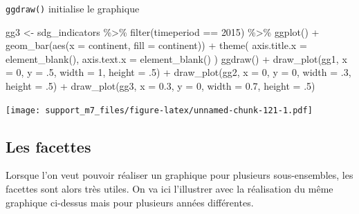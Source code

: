 \documentclass[
]{book}
\newenvironment{Shaded}{\begin{snugshade}}{\end{snugshade}}
\newcommand{\AttributeTok}[1]{\textcolor[rgb]{0.77,0.63,0.00}{#1}}
\newcommand{\DecValTok}[1]{\textcolor[rgb]{0.00,0.00,0.81}{#1}}
\newcommand{\FloatTok}[1]{\textcolor[rgb]{0.00,0.00,0.81}{#1}}
\newcommand{\FunctionTok}[1]{\textcolor[rgb]{0.00,0.00,0.00}{#1}}
\newcommand{\NormalTok}[1]{#1}
\newcommand{\OtherTok}[1]{\textcolor[rgb]{0.56,0.35,0.01}{#1}}
\newcommand{\SpecialCharTok}[1]{\textcolor[rgb]{0.00,0.00,0.00}{#1}}
\begin{document}
\texttt{ggdraw()} initialise le graphique

\begin{Shaded}
\begin{Highlighting}[]
\NormalTok{gg3 }\OtherTok{\textless{}{-}}\NormalTok{ sdg\_indicators }\SpecialCharTok{\%\textgreater{}\%} 
    \FunctionTok{filter}\NormalTok{(timeperiod }\SpecialCharTok{==} \DecValTok{2015}\NormalTok{) }\SpecialCharTok{\%\textgreater{}\%} 
    \FunctionTok{ggplot}\NormalTok{() }\SpecialCharTok{+}
    \FunctionTok{geom\_bar}\NormalTok{(}\FunctionTok{aes}\NormalTok{(}\AttributeTok{x =}\NormalTok{ continent, }\AttributeTok{fill =}\NormalTok{ continent)) }\SpecialCharTok{+}
  \FunctionTok{theme}\NormalTok{(}
    \AttributeTok{axis.title.x =} \FunctionTok{element\_blank}\NormalTok{(),}
    \AttributeTok{axis.text.x =} \FunctionTok{element\_blank}\NormalTok{()}
\NormalTok{  )}
\FunctionTok{ggdraw}\NormalTok{() }\SpecialCharTok{+}
  \FunctionTok{draw\_plot}\NormalTok{(gg1, }\AttributeTok{x =} \DecValTok{0}\NormalTok{, }\AttributeTok{y =}\NormalTok{ .}\DecValTok{5}\NormalTok{, }\AttributeTok{width =} \DecValTok{1}\NormalTok{, }\AttributeTok{height =}\NormalTok{ .}\DecValTok{5}\NormalTok{) }\SpecialCharTok{+}
  \FunctionTok{draw\_plot}\NormalTok{(gg2, }\AttributeTok{x =} \DecValTok{0}\NormalTok{, }\AttributeTok{y =} \DecValTok{0}\NormalTok{, }\AttributeTok{width =}\NormalTok{ .}\DecValTok{3}\NormalTok{, }\AttributeTok{height =}\NormalTok{ .}\DecValTok{5}\NormalTok{) }\SpecialCharTok{+}
  \FunctionTok{draw\_plot}\NormalTok{(gg3, }\AttributeTok{x =} \FloatTok{0.3}\NormalTok{, }\AttributeTok{y =} \DecValTok{0}\NormalTok{, }\AttributeTok{width =} \FloatTok{0.7}\NormalTok{, }\AttributeTok{height =}\NormalTok{ .}\DecValTok{5}\NormalTok{)}
\end{Highlighting}
\end{Shaded}

\texttt{[image: support\_m7\_files/figure-latex/unnamed-chunk-121-1.pdf]}

\hypertarget{les-facettes}{%
\subsection{Les facettes}\label{les-facettes}}

Lorsque l'on veut pouvoir réaliser un graphique pour plusieurs sous-ensembles, les facettes sont alors très utiles. On va ici l'illustrer avec la réalisation du même graphique ci-dessus mais pour plusieurs années différentes.
\end{document}
